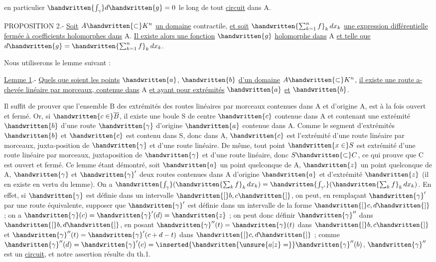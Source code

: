 en particulier $\handwritten{\int_\gamma}d\handwritten{g}=0$ le long de tout \uline{circuit} dans A.

PROPOSITION 2.- \uline{Soit} $A\handwritten{\subset}K^n$ \uline{un domaine} contractile, \uline{et soit} $\handwritten{\sum_{k=1}^n f}_k\,dx_k$ \uline{une expression différentielle fermée à coefficients holomorphes dans} A. \uline{Il existe alors une fonction} $\handwritten{g}$ \uline{holomorphe dans} A \uline{et telle que} $d\handwritten{g}=\handwritten{\sum_{k=1}^n f}_k\,dx_k$.

Nous utiliserons le lemme suivant :

\uline{Lemme 1}.- \uline{Quels que soient les points} $\handwritten{a}$, $\handwritten{b}$ \uline{d'un domaine} $A\handwritten{\subset}K^n$, \uline{il existe une route a-chevée linéaire par morceaux, contenue dans} A \uline{et ayant pour extrémités} $\handwritten{a}$ \uline{et} $\handwritten{b}$.

Il suffit de prouver que l'ensemble B des extrémités des routes linéaires par morceaux contenues dans A et d'origine A, est à la fois ouvert et fermé. Or, si $\handwritten{c\in}\overline{B}$, il existe une boule S de centre $\handwritten{c}$ contenue dans A et contenant une extrémité $\handwritten{b}$ d'une route $\handwritten{\gamma}$ d'origine $\handwritten{a}$ contenue dans A. Comme le segment d'extrémités $\handwritten{b}$ et $\handwritten{c}$ est contenu dans S, donc dans A, $\handwritten{c}$ est l'extrémité d'une route linéaire par morceaux, juxta-position de $\handwritten{\gamma}$ et d'une route linéaire. De même, tout point $\handwritten{x\in}S$ est extrémité d'une route linéaire par morceaux, juxtaposition de $\handwritten{\gamma}$ et d'une route linéaire, donc $S\handwritten{\subset}C$, ce qui prouve que C est ouvert et fermé. Ce lemme étant démontré, soit $\handwritten{a}$ un point quelconque de A, $\handwritten{z}$ un point quelconque de A, $\handwritten{\gamma}$ et $\handwritten{\gamma}'$ deux routes contenues dans A d'origine $\handwritten{a}$ et d'extrémité $\handwritten{z}$ (il en existe en vertu du lemme). On a $\handwritten{\int_\gamma}(\handwritten{\sum_k f}_k\,dx_k)=\handwritten{\int_{\gamma'}}(\handwritten{\sum_k f}_k\,dx_k)$. En effet, si $\handwritten{\gamma}$ est définie dans un intervalle $\handwritten{[}b,c\handwritten{]}$, on peut, en remplaçant $\handwritten{\gamma}'$ par une route équivalente, supposer que $\handwritten{\gamma}'$ est définie dans un intervalle de la forme $\handwritten{[}c,d\handwritten{]}$ ; on a $\handwritten{\gamma}(c)=\handwritten{\gamma}'(d)=\handwritten{z}$ ; on peut donc définir $\handwritten{\gamma}''$ dans $\handwritten{[}b,d\handwritten{]}$, en posant $\handwritten{\gamma}''(t)=\handwritten{\gamma}(t)$ dans $\handwritten{[}b,c\handwritten{]}$ et $\handwritten{\gamma}''(t)=\handwritten{\gamma}'(c+d-t)$ dans $\handwritten{[}c,d\handwritten{]}$ ; comme $\handwritten{\gamma}''(d)=\handwritten{\gamma}'(c)=\inserted{\handwritten{\unsure{a|z}=}}\handwritten{\gamma}''(b)$, $\handwritten{\gamma}''$ est un \uline{circuit}, et notre assertion résulte du th.1.

